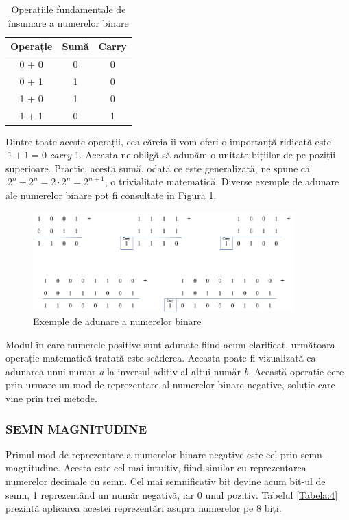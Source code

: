\documentclass[12pt]{article}
\begin{document}
\begin{table}[h]
\centering
\caption{Operațiile fundamentale de însumare a numerelor binare }
\label{Tabela:3}
\begin{tabular}{ ||c|c|c|| }
 \hline
 Operație & Sumă & Carry \\ 
 \hline  \hline
 0 + 0 & 0 & 0\\
 \hline
 0 + 1 & 1  & 0\\
 \hline
 1 + 0 &  1 & 0 \\
 \hline
 1 + 1 & 0 & 1 \\
 \hline
\end{tabular}
\end{table}
Dintre toate aceste operații, cea căreia îi vom oferi o importanță ridicată este $\ 1 + 1 = 0$ \textit{carry} 1. Aceasta  ne obligă să adunăm o unitate bițiilor de pe poziții superioare. Practic, acestă sumă, odată ce este generalizată, ne spune că $\ 2^n + 2^n = 2 \cdot 2^n = 2^{n+1}$, o trivialitate matematică. Diverse exemple de adunare ale numerelor binare pot fi consultate în Figura \ref{Figura:2}.

 \begin{figure}[h!]
 \centering
 \caption{Exemple de adunare a numerelor binare}
 \label{Figura:2}
 \includegraphics[width=0.9\textwidth]{binary_addition.png}
 \end{figure}

Modul în care numerele positive sunt adunate fiind acum clarificat, următoara operație matematică tratată este scăderea. Aceasta poate fi vizualizată ca adunarea unui numar \textit{a} la inversul aditiv al altui număr \textit{b}.
Această operație cere prin urmare un mod de reprezentare al numerelor binare negative, soluție care vine prin trei metode.

\subsubsection{SEMN MAGNITUDINE}
Primul mod de reprezentare a numerelor binare negative este cel prin semn-magnitudine. Acesta este cel mai intuitiv, fiind similar cu reprezentarea numerelor decimale cu semn. Cel mai semnificativ bit devine acum bit-ul de semn, 1 reprezentând un număr negativă, iar 0 unul pozitiv. Tabelul \ref{Tabela:4} prezintă aplicarea acestei reprezentări asupra numerelor pe 8 biți.
\end{document}
